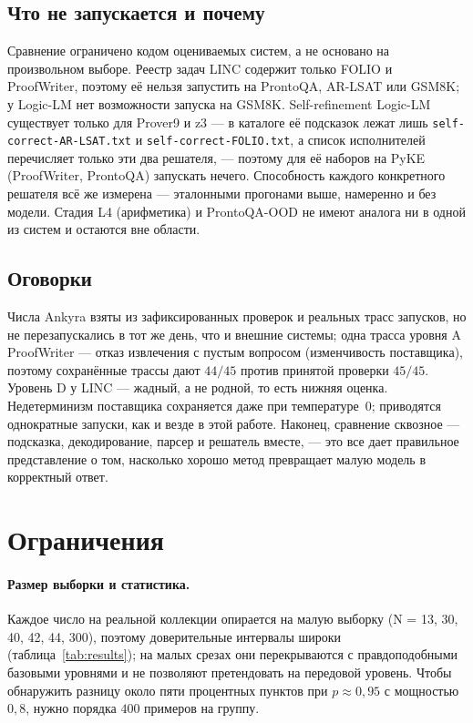 \documentclass[11pt,a4paper]{article}
\begin{document}
\subsection{Что не запускается и почему}
\label{sec:comparison-notrun}

Сравнение ограничено кодом оцениваемых систем, а не основано на произвольном выборе. Реестр задач LINC содержит только FOLIO и ProofWriter, поэтому её нельзя запустить
на ProntoQA, AR-LSAT или GSM8K; у Logic-LM нет возможности запуска на GSM8K. Self-refinement Logic-LM существует только для Prover9 и z3 — в каталоге её
подсказок лежат лишь \texttt{self-correct-AR-LSAT.txt} и \texttt{self-correct-FOLIO.txt}, а список исполнителей перечисляет только эти два
решателя, — поэтому для её наборов на PyKE (ProofWriter, ProntoQA) запускать нечего. Способность каждого конкретного решателя всё же
измерена — эталонными прогонами выше, намеренно и без модели. Стадия L4 (арифметика) и ProntoQA-OOD не имеют аналога ни в одной из систем
и остаются вне области.

\subsection{Оговорки}
\label{sec:comparison-caveats}

Числа Ankyra взяты из зафиксированных проверок и реальных трасс запусков, но не перезапускались в тот же день, что и внешние системы; одна трасса
уровня A ProofWriter — отказ извлечения с пустым вопросом (изменчивость поставщика), поэтому сохранённые трассы дают $44/45$ против
принятой проверки $45/45$. Уровень D у LINC — жадный, а не родной, то есть нижняя оценка. Недетерминизм поставщика сохраняется даже
при температуре~$0$; приводятся однократные запуски, как и везде в этой работе. Наконец, сравнение сквозное — подсказка, декодирование,
парсер и решатель вместе, — это все дает правильное представление о том, насколько хорошо метод превращает малую модель в корректный ответ.

\section{Ограничения}
\label{sec:limitations}

\paragraph{Размер выборки и статистика.} Каждое число на реальной коллекции опирается на малую выборку
(N = 13, 30, 40, 42, 44, 300), поэтому доверительные интервалы широки (таблица~\ref{tab:results});
на малых срезах они перекрываются с правдоподобными базовыми уровнями и не позволяют претендовать на
передовой уровень. Чтобы обнаружить разницу около пяти процентных пунктов при $p\approx0{,}95$
с мощностью $0{,}8$, нужно порядка $400$ примеров на группу.
\end{document}
